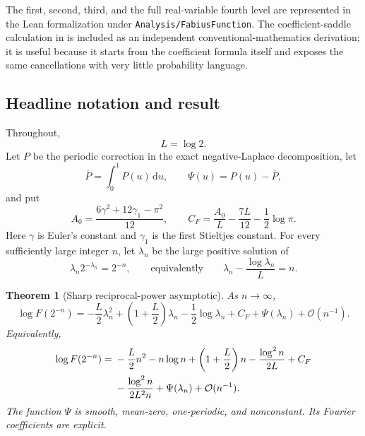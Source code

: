 \documentclass[11pt,oneside]{article}
\newtheorem{theorem}{Theorem}[section]
\theoremstyle{definition}
\theoremstyle{remark}
\newcommand{\dd}{\,\mathrm d}
\newcommand{\bigO}{\mathcal O}
\newcommand{\repo}{\nolinkurl{Analysis/FabiusFunction}}
\begin{document}
The first, second, third, and the full real-variable fourth level are represented in the Lean
formalization under \repo.  The coefficient-saddle calculation in 
is included as an independent conventional-mathematics derivation; it is useful because it
starts from the coefficient formula itself and exposes the same cancellations with very
little probability language.

\subsection{Headline notation and result}

Throughout,
\begin{equation}
 L=\log2.                                                     \label{dyadicasym:eq:L}
\end{equation}
Let $P$ be the periodic correction in the exact negative-Laplace decomposition, let
\begin{equation}
 \overline P=\int_0^1P(u)\dd u,
 \qquad \Psi(u)=P(u)-\overline P,                            \label{dyadicasym:eq:Psi-intro}
\end{equation}
and put
\begin{equation}
 A_0=\frac{6\gamma^2+12\gamma_1-\pi^2}{12},
 \qquad
 C_F=\frac{A_0}{L}-\frac{7L}{12}-\frac12\log\pi.            \label{dyadicasym:eq:CF-intro}
\end{equation}
Here $\gamma$ is Euler's constant and $\gamma_1$ is the first Stieltjes constant.
For every sufficiently large integer $n$, let $\lambda_n$ be the large positive solution of
\begin{equation}
 \lambda_n2^{-\lambda_n}=2^{-n},
 \qquad\text{equivalently}\qquad
 \lambda_n-\frac{\log\lambda_n}{L}=n.                       \label{dyadicasym:eq:lambda-n-intro}
\end{equation}

\begin{theorem}[Sharp reciprocal-power asymptotic]
\label{dyadicasym:thm:headline}
As $n\to\infty$,
\begin{equation}
 \boxed{
 \log F(2^{-n})=
 -\frac L2\lambda_n^2+
 \left(1+\frac L2\right)\lambda_n-\frac12\log\lambda_n
 +C_F+\Psi(\lambda_n)+\bigO(n^{-1}).}                       \label{dyadicasym:eq:headline-compact}
\end{equation}
Equivalently,
\begin{align}
 \log F(2^{-n})={}&-\frac L2n^2-n\log n+
 \left(1+\frac L2\right)n-\frac{\log^2n}{2L}+C_F           \notag\\
 &-\frac{\log^2n}{2L^2n}+\Psi(\lambda_n)+\bigO(n^{-1}).   \label{dyadicasym:eq:headline-expanded}
\end{align}
The function $\Psi$ is smooth, mean-zero, one-periodic, and nonconstant.  Its Fourier
coefficients are explicit.
\end{theorem}
\end{document}

